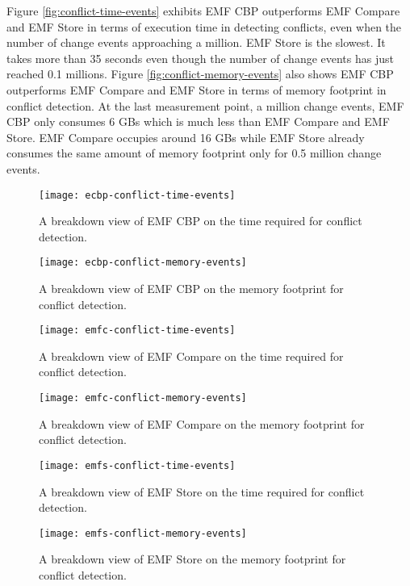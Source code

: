 Figure \ref{fig:conflict-time-events} exhibits EMF CBP outperforms EMF Compare and EMF Store in terms of execution time in detecting conflicts, even when the number of change events approaching a million. EMF Store is the slowest. It takes more than 35 seconds even though the number of change events has just reached 0.1 millions. Figure \ref{fig:conflict-memory-events} also shows EMF CBP outperforms EMF Compare and EMF Store in terms of memory footprint in conflict detection. At the last measurement point, a million change events, EMF CBP only consumes 6 GBs which is much less than EMF Compare and EMF Store. EMF Compare occupies around 16 GBs while EMF Store already consumes the same amount of memory footprint only for 0.5 million change events.

\begin{figure*}[]
  \centering
  \begin{minipage}[b]{0.490\textwidth}
    \texttt{[image: ecbp-conflict-time-events]}
    \caption{A breakdown view of EMF CBP on the time required for conflict detection.}
    \label{fig:ecbp-conflict-time-events}    
  \end{minipage}
  \hfill
  \begin{minipage}[b]{0.490\textwidth}
    \texttt{[image: ecbp-conflict-memory-events]}
    \caption{A breakdown view of EMF CBP on the memory footprint for conflict detection.}
    \label{fig:ecbp-conflict-memory-events}    
  \end{minipage}  
\end{figure*}

\begin{figure*}[]
  \centering
  \begin{minipage}[b]{0.490\textwidth}
    \texttt{[image: emfc-conflict-time-events]}
    \caption{A breakdown view of EMF Compare on the time required for conflict detection.}
    \label{fig:emfc-conflict-time-events}
  \end{minipage}
  \hfill
  \begin{minipage}[b]{0.490\textwidth}
    \texttt{[image: emfc-conflict-memory-events]}
    \caption{A breakdown view of EMF Compare on the memory footprint for conflict detection.}
    \label{fig:emfc-conflict-memory-events}
  \end{minipage}
\end{figure*}

\begin{figure*}[]
  \begin{minipage}[b]{0.490\textwidth}
    \texttt{[image: emfs-conflict-time-events]}
    \caption{A breakdown view of EMF Store on the time required for conflict detection.}
    \label{fig:emfs-conflict-time-events}
  \end{minipage}
  \hfill
  \begin{minipage}[b]{0.490\textwidth}
    \texttt{[image: emfs-conflict-memory-events]}
    \caption{A breakdown view of EMF Store on the memory footprint for conflict detection.}
    \label{fig:emfs-conflict-memory-events}
  \end{minipage}
\end{figure*}

